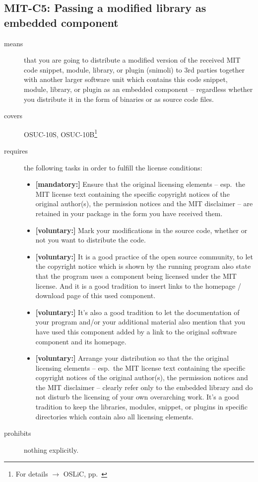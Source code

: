 \subsection{MIT-C5: Passing a modified library as embedded component}
\label{OSUC-10S-MIT}\label{OSUC-10B-MIT}
\begin{description}
\item[means] that you are going to distribute a modified version of the received
MIT code snippet, module, library, or plugin (snimoli) to 3rd parties together
with another larger software unit which contains this code snippet, module,
library, or plugin as an embedded component -- regardless whether you distribute
it in the form of binaries or as source code files.

\item[covers] OSUC-10S, OSUC-10B\footnote{For details $\rightarrow$ OSLiC, pp.\
\pageref{OSUC-10S-DEF}}
\item[requires] the following tasks in order to fulfill the license conditions:
\begin{itemize}
  \item \textbf{[mandatory:]} Ensure that the original licensing elements -- esp.\
  the MIT license text containing the specific copyright notices of the original
  author(s), the permission notices and the MIT disclaimer -- are retained in
  your package in the form you have received them.
  \item \textbf{[voluntary:]} Mark your modifications in the source code,
  whether or not you want to distribute the code.
  
  \item \textbf{[voluntary:]} It is a good practice of the open source
  community, to let the copyright notice which is shown by the running program
  also state that the program uses a component being licensed under the MIT
  license. And it is a good tradition to insert links to the homepage / download
  page of this used component.

  \item \textbf{[voluntary:]} It's also a good tradition to let the
  documentation of your program and/or your additional material also mention
  that you have used this component added by a link to the original software
  component and its homepage.
  
  \item \textbf{[voluntary:]} Arrange your distribution so that the the original
  licensing elements -- esp.\ the MIT license text containing the specific
  copyright notices of the original author(s), the permission notices and the
  MIT disclaimer --  clearly refer only to the embedded library and do not
  disturb the licensing of your own overarching work. It's a good tradition to
  keep the libraries, modules, snippet, or plugins in specific directories which
  contain also all licensing elements.
  
\end{itemize}
\item[prohibits] nothing explicitly.
\end{description}

